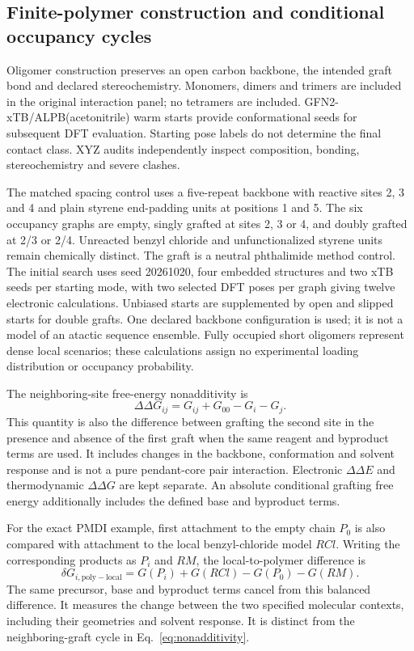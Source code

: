 \documentclass[11pt]{article}
\begin{document}
\subsection{Finite-polymer construction and conditional occupancy cycles}
Oligomer construction preserves an open carbon backbone, the intended graft bond and declared stereochemistry. Monomers, dimers and trimers are included in the original interaction panel; no tetramers are included. GFN2-xTB/ALPB(acetonitrile) warm starts provide conformational seeds for subsequent DFT evaluation.\cite{gfn22019,alpb2021} Starting pose labels do not determine the final contact class. XYZ audits independently inspect composition, bonding, stereochemistry and severe clashes.

The matched spacing control uses a five-repeat backbone with reactive sites 2, 3 and 4 and plain styrene end-padding units at positions 1 and 5. The six occupancy graphs are empty, singly grafted at sites 2, 3 or 4, and doubly grafted at 2/3 or 2/4. Unreacted benzyl chloride and unfunctionalized styrene units remain chemically distinct. The graft is a neutral phthalimide method control. The initial search uses seed 20261020, four embedded structures and two xTB seeds per starting mode, with two selected DFT poses per graph giving twelve electronic calculations. Unbiased starts are supplemented by open and slipped starts for double grafts. One declared backbone configuration is used; it is not a model of an atactic sequence ensemble. Fully occupied short oligomers represent dense local scenarios; these calculations assign no experimental loading distribution or occupancy probability.

The neighboring-site free-energy nonadditivity is
\begin{equation}
\Delta\Delta G_{ij}=G_{ij}+G_{00}-G_i-G_j.
\label{eq:nonadditivity}
\end{equation}
This quantity is also the difference between grafting the second site in the presence and absence of the first graft when the same reagent and byproduct terms are used. It includes changes in the backbone, conformation and solvent response and is not a pure pendant-core pair interaction. Electronic $\Delta\Delta E$ and thermodynamic $\Delta\Delta G$ are kept separate. An absolute conditional grafting free energy additionally includes the defined base and byproduct terms.

For the exact PMDI example, first attachment to the empty chain $P_0$ is also compared with attachment to the local benzyl-chloride model $RCl$. Writing the corresponding products as $P_i$ and $RM$, the local-to-polymer difference is
\begin{equation}
\delta G_{i,\mathrm{poly-local}}=G(P_i)+G(RCl)-G(P_0)-G(RM).
\label{eq:polylocal}
\end{equation}
The same precursor, base and byproduct terms cancel from this balanced difference. It measures the change between the two specified molecular contexts, including their geometries and solvent response. It is distinct from the neighboring-graft cycle in Eq.~\ref{eq:nonadditivity}.
\end{document}
